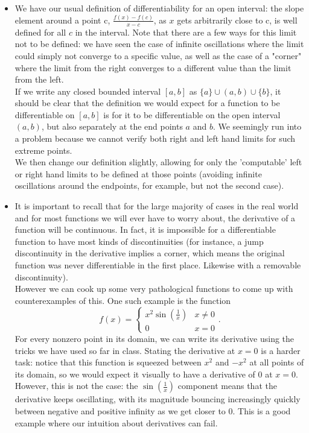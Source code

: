 \documentclass[11 pt]{article}
\begin{document}
\begin{solution}
	\begin{itemize}
		\item We have our usual definition of differentiability for an open interval: the slope element around a point c, $\frac{f(x)-f(c)}{x-c}$, as $x$ gets arbitrarily close to c, is well defined for all $c$ in the interval. Note that there are a few ways for this limit not to be defined: we have seen the case of infinite oscillations where the limit could simply not converge to a specific value, as well as the case of a "corner" where the limit from the right converges to a different value than the limit from the left.\\
			If we write any closed bounded interval  $[a,b]$ as $\{a\}\cup(a,b)\cup\{b\}$, it should be clear that the definition  we would expect for a function to be differentiable on $[a,b]$ is for it to be differentiable on the open interval $(a,b)$, but also separately at the end points $a$ and $b$. We seemingly run into a problem because we cannot verify both right and left hand limits for such extreme points.\\
			We then change our definition slightly, allowing for only the 'computable' left or right hand limits to be defined at those points (avoiding infinite oscillations around the endpoints, for example, but not the second case).
		\item It is important to recall that for the large majority of cases in the real world and for most functions we will ever have to worry about, the derivative of a function will be continuous. In fact, it is impossible for a differentiable function to have most kinds of discontinuities (for instance, a jump discontinuity in the derivative implies a corner, which means the original function was never differentiable in the first place. Likewise with a removable discontinuity).\\
			However we can cook up some very pathological functions to come up with counterexamples of this. One such example is the function \[
		f(x) = \begin{cases}
			x^2\sin(\frac{1}{x}) & x\neq 0 \\
			0 & x=0
			\end{cases}
		.\] 
		For every nonzero point in its domain, we can write its derivative using the tricks we have used so far in class. Stating the derivative at $x=0$ is a harder task: notice that this function is squeezed between $x^2$ and  $-x^2$ at all points of its domain, so we would expect it visually to have a derivative of 0 at $x=0$. However, this is not the case: the  $\sin(\frac{1}{x})$ component means that the derivative keeps oscillating, with its magnitude bouncing increasingly quickly between negative and positive infinity as we get closer to 0. This is a good example where our intuition about derivatives can fail.
	\end{itemize}
\end{solution} 
\end{document}
